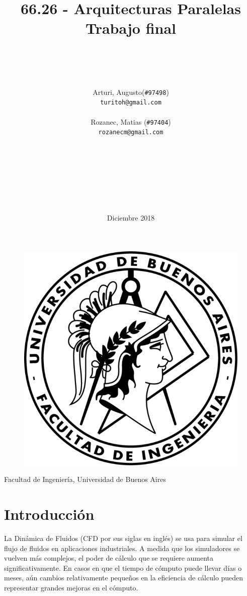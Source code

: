 \documentclass{article}
\title{66.26 - Arquitecturas Paralelas\\Trabajo final}
\author{
    \\\\\\\\
    Arturi, Augusto(\texttt{\#97498})\\\texttt{turitoh@gmail.com}\\
    \\
    Rozanec, Matias (\texttt{\#97404})\\\texttt{rozanecm@gmail.com}\\
    \\\\\\\\\\\\\\
}
\date{Diciembre 2018}
\begin{document}
\maketitle
\begin{figure}[!htp]
    \centering
    \includegraphics[scale=1]{../res/fiuba_logo.png} 
\end{figure}
\begin{center}\normalsize{Facultad de Ingeniería, Universidad de Buenos Aires}\end{center}
\newpage

\tableofcontents
\newpage

% 


\section{Introducción}

La Dinámica de Fluidos (CFD por sus siglas en inglés) se usa para simular el flujo de fluidos en aplicaciones industriales. A medida que los simuladores se vuelven más complejos, el poder de cálculo que se requiere aumenta significativamente. En casos en que el tiempo de cómputo puede llevar días o meses, aún cambios relativamente pequeños en la eficiencia de cálculo pueden representar grandes mejoras en el cómputo.
\end{document}
